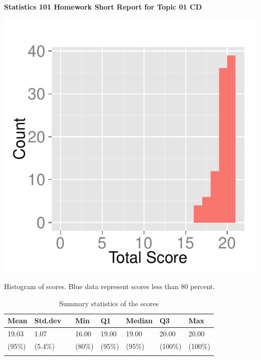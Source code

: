 \documentclass[12pt,english,nohyper]{tufte-handout}
\begin{document}
\centerline{\Large\bf Statistics 101 Homework Short Report for Topic 01 CD}
\vspace{1cm}

\begin{marginfigure}
\includegraphics[width=0.98\linewidth]{Topic01_CD_score}
\caption{\label{mar:hist}Histogram of scores. Blue data represent scores less than 80 percent.}
\end{marginfigure}

\begin{longtable}{llllllll}
  \hline
Mean & Std.dev &   & Min & Q1 & Median & Q3 & Max \\ 
  \hline
19.03 & 1.07 &  & 16.00 & 19.00 & 19.00 & 20.00 & 20.00 \\ 
  (95\%) & (5.4\%) &  & (80\%) & (95\%) & (95\%) & (100\%) & (100\%) \\ 
   \hline
\hline
\caption{Summary statistics of the scores} 
\label{tab:summary}
\end{longtable}
\end{document}
